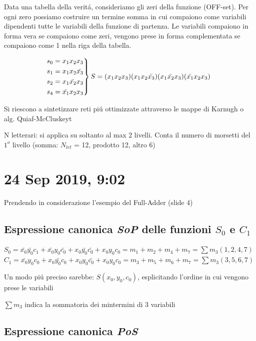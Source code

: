 \documentclass{article}
\begin{document}
Data una tabella della verit\'a, consideriamo gli zeri della funzione (OFF-set). Per ogni zero possiamo costruire un termine somma in cui compaiono come variabili dipendenti tutte le variabili della funzione di partenza.
Le variabili compaiono in forma vera se compaiono come zeri, vengono prese in forma complementata se compaiono come 1 nella riga della tabella.

\[
    \begin{rcases}
        s_0 = x_1 x_2 x_3\\
        s_1 = x_1 x_2 \bar{x_3}\\
        s_2 = x_1 \bar{x_2} x_3\\
        s_4 = \bar{x_1} x_2 x_3
    \end{rcases}
    S =  (x_1 x_2 x_3)(x_1 x_2 \bar{x_3})(x_1 \bar{x_2} x_3)(\bar{x_1} x_2 x_3)
\]

Si riescono a sintetizzare reti pi\'u ottimizzate attraverso le mappe di Karnugh o alg. Quiaf-McCluskeyt

N letterari: si applica su soltanto al max 2 livelli. Conta il numero di morsetti del $1^o$ livello (somma: $N_{let}$ = 12, prodotto 12, altro 6)

\section{24 Sep 2019,  9:02}
Prendendo in considerazione l'esempio del Full-Adder (slide 4)
\subsection{Espressione canonica \textit{SoP} delle funzioni $S_0$ e $C_1$}
$S_0 = \bar{x_0} \bar{y_0} c_1 + \bar{x_0} y_0 \bar{c_0} + x_0 \bar{y_0} \bar{c_0} + x_0 y_0 c_0 = m_1 + m_2 + m_4 + m_7 = \sum m_3(1, 2, 4, 7)$\\
$C_1 = \bar{x_0} y_0 c_0 + x_0 \bar{y_0} c_0 + x_0 y_0 \bar{c_0} + x_0 y_0 c_0 = m_3 + m_5 + m_6 + m_7 = \sum m_3(3, 5, 6, 7)$

Un modo pi\'u preciso sarebbe: $S(x_0, y_0, c_0) $, esplicitando l'ordine in cui vengono prese le variabili

$\sum m_3$ indica la sommatoria dei mintermini di 3 variabili


\subsection{Espressione canonica \textit{PoS}}
\end{document}

